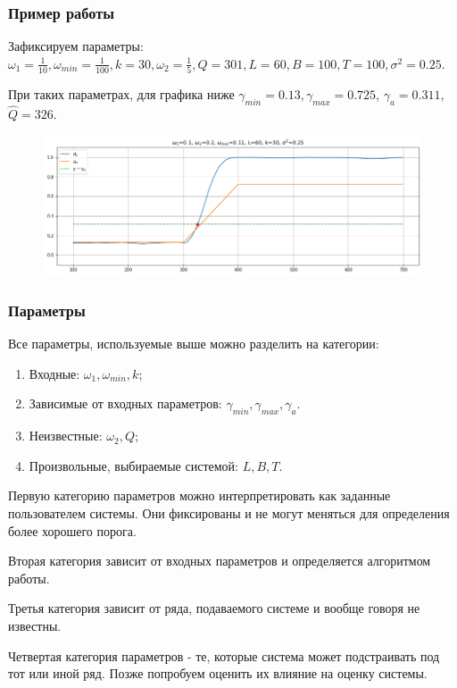 \documentclass[11pt]{beamer}
\begin{document}
	
	
	
	\begin{frame}
		\frametitle{Пример работы}
		Зафиксируем параметры: 
		$ \omega_1=\frac{1}{10}, \omega_{min}=\frac{1}{100}, k=30, \omega_2=\frac{1}{5}, Q=301, L=60, B=100, T=100, \sigma^2=0.25 $.
		
		\bigskip
		
		При таких параметрах, для графика ниже $ \gamma_{min}=0.13, \gamma_{max} = 0.725 $,  $ \gamma_a = 0.311$, $ \hat{Q}=326 $.
		\begin{figure}[b]
			\centering
			\includegraphics[width=\linewidth]{imgs/example_system_work.png}
		\end{figure}
	\end{frame}
	
	\begin{frame}
		\frametitle{Параметры}
		Все параметры, используемые выше можно разделить на категории: 
		\begin{enumerate}
			\item Входные: $ \omega_1, \omega_{min}, k$;
			\item Зависимые от входных параметров: $ \gamma_{min}, \gamma_{max}, \gamma_a $.
			\item Неизвестные: $ \omega_2, Q $;
			\item Произвольные, выбираемые системой: $ L, B, T $.
			
		\end{enumerate}
		
		Первую категорию параметров можно интерпретировать как заданные пользователем системы. Они фиксированы и не могут меняться для определения более хорошего порога.
		
		\bigskip
		
		Вторая категория зависит от входных параметров и определяется алгоритмом работы.
				
		\bigskip
		
		Третья категория зависит от ряда, подаваемого системе и вообще говоря не известны.
		
		\bigskip
		
		Четвертая категория параметров - те, которые система может подстраивать под тот или иной ряд. Позже попробуем оценить их влияние на оценку системы.
	\end{frame}
	
\end{document}
